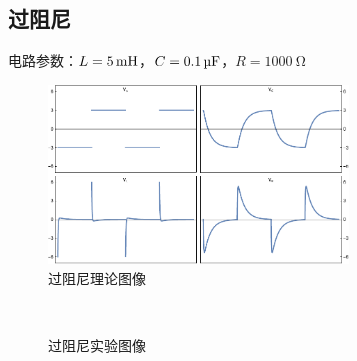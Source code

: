 \documentclass[a4paper,utf8]{article}
\begin{document}
    \subsection{过阻尼}
    电路参数：$L= \SI{5}{\mH}$，$C= \SI{0.1}{\uF}$，$R=\SI{1000}{\ohm}$
    \begin{figure}[!ht]
        \includegraphics[width=0.71\textwidth]{1g.pdf}
        \caption{过阻尼理论图像}
    \end{figure}
    \begin{figure}[!ht]
        \hspace{6mm}
        \\
        \hspace{6mm}
        \caption{过阻尼实验图像}
    \end{figure}\par
    \clearpage
\end{document}
